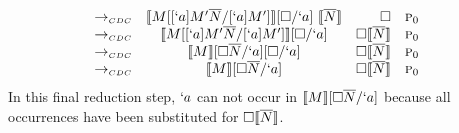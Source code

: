\begin{Proof}
\[\begin{array}{lcrr}
  \tocdc\    & \tr{M[[`a]M'\mult{N}/[`a]M']}[\square/`a]\ \tr{\mult{N}}               & \square & \gp \\
  \tocdc\    & \tr{M[[`a]M'\mult{N}/[`a]M']}[\square/`a]                              & \square \tr{\mult{N}} & \gp \\
  \tocdc\    & \tr{M}[\square \mult{N}/`a][\square/`a]                                & \square \tr{\mult{N}} & \gp \\
  \tocdc\    & \tr{M}[\square \mult{N}/`a]                                            & \square \tr{\mult{N}} & \gp \\
\end{array}
\]
In this final reduction step, $`a$ can not occur in $\llbracket M \rrbracket[\square \overline{N}/`a]$ because all occurrences have been substituted for $\square \llbracket \overline{N} \rrbracket$.


\end{Proof}
